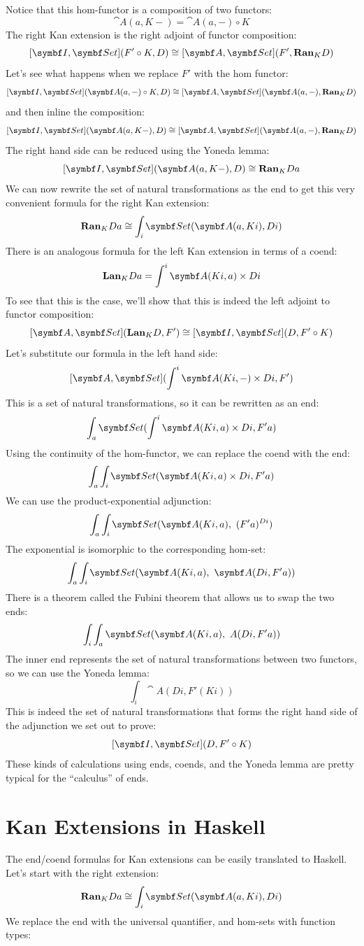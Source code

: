 \noindent
Notice that this hom-functor is a composition of two functors:
\[\cat{A}(a, K -) = \cat{A}(a, -) \circ K\]
The right Kan extension is the right adjoint of functor composition:
\[[\cat{I}, \Set](F' \circ K, D) \cong [\cat{A}, \Set](F', \Ran_{K}D)\]
Let's see what happens when we replace $F'$ with the hom
functor:
\[[\cat{I}, \Set](\cat{A}(a, -) \circ K, D) \cong [\cat{A}, \Set](\cat{A}(a, -), \Ran_{K}D)\]
and then inline the composition:
\[[\cat{I}, \Set](\cat{A}(a, K -), D) \cong [\cat{A}, \Set](\cat{A}(a, -), \Ran_{K}D)\]
The right hand side can be reduced using the Yoneda lemma:
\[[\cat{I}, \Set](\cat{A}(a, K -), D) \cong \Ran_{K}D a\]
We can now rewrite the set of natural transformations as the end to get
this very convenient formula for the right Kan extension:
\[\Ran_{K}D a \cong \int_i \Set(\cat{A}(a, K i), D i)\]
There is an analogous formula for the left Kan extension in terms of a
coend:
\[\Lan_{K}D a = \int^i \cat{A}(K i, a)\times{}D i\]
To see that this is the case, we'll show that this is indeed the left
adjoint to functor composition:
\[[\cat{A}, \Set](\Lan_{K}D, F') \cong [\cat{I}, \Set](D, F' \circ K)\]
Let's substitute our formula in the left hand side:
\[[\cat{A}, \Set](\int^i \cat{A}(K i, -)\times{}D i, F')\]
This is a set of natural transformations, so it can be rewritten as an
end:
\[\int_a \Set(\int^i \cat{A}(K i, a)\times{}D i, F' a)\]
Using the continuity of the hom-functor, we can replace the coend with
the end:
\[\int_a \int_i \Set(\cat{A}(K i, a)\times{}D i, F' a)\]
We can use the product-exponential adjunction:
\[\int_a \int_i \Set(\cat{A}(K i, a),\ (F' a)^{D i})\]
The exponential is isomorphic to the corresponding hom-set:
\[\int_a \int_i \Set(\cat{A}(K i, a),\ \cat{A}(D i, F' a))\]
There is a theorem called the Fubini theorem that allows us to swap the
two ends:
\[\int_i \int_a \Set(\cat{A}(K i, a),\ A(D i, F' a))\]
The inner end represents the set of natural transformations between two
functors, so we can use the Yoneda lemma:
\[\int_i \cat{A}(D i, F' (K i))\]
This is indeed the set of natural transformations that forms the right
hand side of the adjunction we set out to prove:
\[[\cat{I}, \Set](D, F' \circ K)\]
These kinds of calculations using ends, coends, and the Yoneda lemma are
pretty typical for the ``calculus'' of ends.

\section{Kan Extensions in Haskell}

The end/coend formulas for Kan extensions can be easily translated to
Haskell. Let's start with the right extension:
\[\Ran_{K}D a \cong \int_i \Set(\cat{A}(a, K i), D i)\]
We replace the end with the universal quantifier, and hom-sets with
function types:

